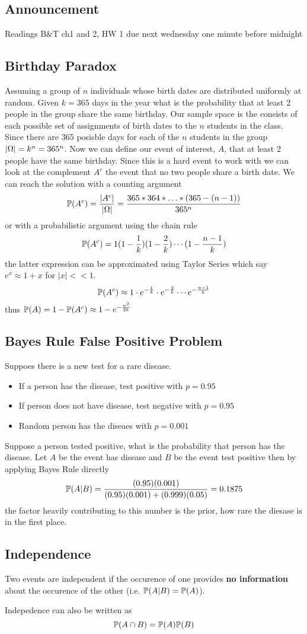 \documentclass[11pt]{scrartcl}
\begin{document}
\subsection{Announcement}
Readings B\&T ch1 and 2, HW 1 due next wednesday one minute before midnight 

\subsection{Birthday Paradox} 
Assuming a group of $n$ individuals whose birth dates are distributed uniformly
at random. Given $k=365$ days in the year what is the probability that at least
2 people in the group share the same birthday. Our sample space is the consists
  of each possible set of assignments of birth dates to the  $n$ students in
  the class. Since there are 365 posisble days for each of the  $n$ students in
  the group $|\Omega| = k^{n} = 365^{n} $. Now we can define our event of
  interest, $A$, that at least 2 people have the same birthday. Since this is
  a hard event to work with we can look at the complement $A^{c} $ the event
  that no two people share a birth date. We can reach the solution with
  a counting argument
  \[
    \mathbb{P}(A^{c}) = \frac{|A^{c}|}{|\Omega|} = \frac{365 * 364 *\ldots*(365
    - (n-1))}{365^{n} }
  \]
  or with a probabilistic argument using the chain rule \[
    \mathbb{P}(A^{c} ) = 1(1-\frac{1}{k})(1-\frac{2}{k})\cdots(1 - \frac{n-1}{k})
  \]
  the latter expression can be approximated using Taylor Series which say
  $e^{x} \approx 1 + x $ for $|x|<<1$.  \[
    \mathbb{P}(A^{c} )\approx 1\cdot e^{-\frac{1}{k}} \cdot e^{-\frac{2}{k}} \cdots
    e^{-\frac{n-1}{k}} 
  \] thus $\mathbb{P}(A)=1-\mathbb{P}(A^{c} )\approx 1 - e^{-\frac{n^2}{2k}} $ 

\subsection{Bayes Rule False Positive Problem} 
Suppoes there is a new test for a rare disease. 
\begin{itemize}
  \item If a person has the disease, test positive with $p=0.95$
     \item If person does not have disease, test negative with $p=0.95$ 
       \item Random person has the diseaes with $p=0.001$
\end{itemize}
Suppose a person tested positive, what is the probability that person has the
disease. Let $A$ be the event has disease and  $B$ be the event test positive
then by applying Bayes Rule directly  \[
  \mathbb{P}(A|B) = \frac{(0.95)(0.001)}{(0.95)(0.001) + (0.999)(0.05)} = 0.1875
\] the factor heavily contributing to this number is the prior, how rare the
diesase is in the first place. 
\subsection{Independence} 
\begin{definition}
  Two events are independent if the occurence of one provides \textbf{no
  information} about the occurence of the other (i.e. $\mathbb{P}(A|B) = \mathbb{P}(A)$). 
\end{definition}
Indepedence can also be written as \[
  \mathbb{P}(A\cap B) = \mathbb{P}(A)\mathbb{P}(B)
\] 
\end{document}
